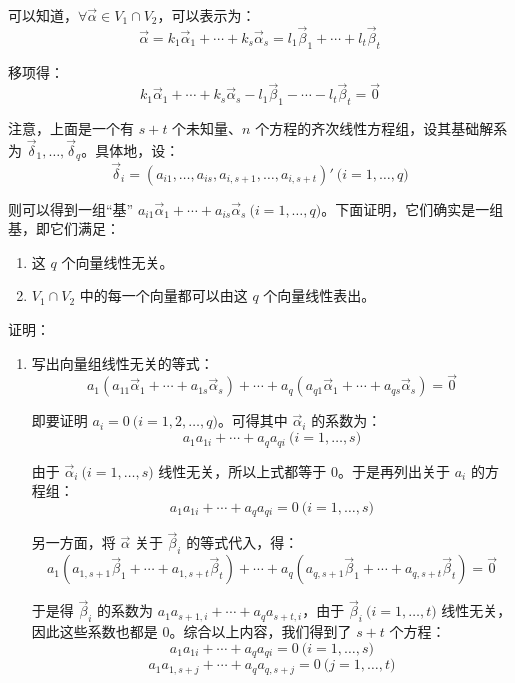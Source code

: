 \begin{solve}
	可以知道，$\forall \vec \alpha \in V_1 \cap V_2$，可以表示为：
	$$
	\vec \alpha = k_1 \vec \alpha_1 + \cdots + k_s \vec \alpha_s = l_1 \vec \beta_1 + \cdots + l_t \vec \beta_t
	$$

	移项得：
	$$
	k_1 \vec \alpha_1 + \cdots + k_s \vec \alpha_s - l_1 \vec \beta_1 - \cdots - l_t \vec \beta_t = \vec 0
	$$

	注意，上面是一个有 $s + t$ 个未知量、$n$ 个方程的齐次线性方程组，设其基础解系为 $\vec \delta_1, \ldots, \vec \delta_q$。具体地，设：
	$$
	\vec \delta_i = (a_{i1}, \ldots, a_{is}, a_{i, s + 1}, \ldots, a_{i, s + t})' \pod{i = 1, \ldots, q}
	$$

	则可以得到一组“基” $a_{i1} \vec \alpha_1 + \cdots + a_{is} \vec \alpha_s \pod{i = 1, \ldots, q}$。下面证明，它们确实是一组基，即它们满足：
	\begin{enumerate}
		\item 这 $q$ 个向量线性无关。
		\item $V_1 \cap V_2$ 中的每一个向量都可以由这 $q$ 个向量线性表出。
	\end{enumerate}

	证明：
	\begin{enumerate}
		\item 写出向量组线性无关的等式：
		$$
		a_1 (a_{11} \vec \alpha_1 + \cdots + a_{1s} \vec \alpha_s) + \cdots + a_q(a_{q1} \vec \alpha_1 + \cdots + a_{qs} \vec \alpha_s) = \vec 0
		$$

		即要证明 $a_i = 0 \pod{i = 1, 2, \ldots, q}$。可得其中 $\vec \alpha_i$ 的系数为：
		$$
		a_1 a_{1i} + \cdots + a_q a_{qi} \pod{i = 1, \ldots, s}
		$$

		由于 $\vec \alpha_i \pod{i = 1, \ldots, s}$ 线性无关，所以上式都等于 $0$。于是再列出关于 $a_i$ 的方程组：
		$$
		a_1 a_{1i} + \cdots + a_q a_{qi} = 0 \pod{i = 1, \ldots, s}
		$$

		另一方面，将 $\vec \alpha$ 关于 $\vec \beta_i$ 的等式代入，得：
		$$
		a_1(a_{1, s + 1} \vec \beta_1 + \cdots + a_{1, s + t} \vec \beta_t) + \cdots + a_q(a_{q, s + 1} \vec \beta_1 + \cdots + a_{q, s + t} \vec \beta_t) = \vec 0
		$$

		于是得 $\vec \beta_i$ 的系数为 $a_1 a_{s + 1, i} + \cdots + a_q a_{s + t, i}$，由于 $\vec \beta_i \pod{i = 1, \ldots, t}$ 线性无关，因此这些系数也都是 $0$。综合以上内容，我们得到了 $s + t$ 个方程：
		$$
		a_1 a_{1i} + \cdots + a_q a_{qi} = 0 \pod{i = 1, \ldots, s}
		$$$$
		a_1 a_{1, s + j} + \cdots + a_q a_{q, s + j} = 0 \pod{j = 1, \ldots, t}
		$$


\end{enumerate}
\end{solve}
